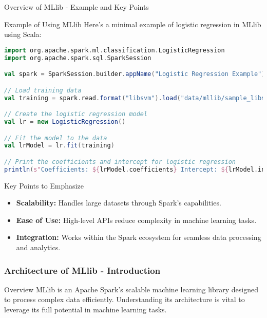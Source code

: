 \documentclass[aspectratio=169]{beamer}
\begin{document}
\begin{frame}[fragile]{Overview of MLlib - Example and Key Points}
    \begin{block}{Example of Using MLlib}
        Here’s a minimal example of logistic regression in MLlib using Scala:
        \begin{lstlisting}[language=Scala]
import org.apache.spark.ml.classification.LogisticRegression
import org.apache.spark.sql.SparkSession

val spark = SparkSession.builder.appName("Logistic Regression Example").getOrCreate()

// Load training data
val training = spark.read.format("libsvm").load("data/mllib/sample_libsvm_data.txt")

// Create the logistic regression model
val lr = new LogisticRegression()

// Fit the model to the data
val lrModel = lr.fit(training)

// Print the coefficients and intercept for logistic regression
println(s"Coefficients: ${lrModel.coefficients} Intercept: ${lrModel.intercept}")
        \end{lstlisting}
    \end{block}

    \begin{block}{Key Points to Emphasize}
        \begin{itemize}
            \item \textbf{Scalability:} Handles large datasets through Spark’s capabilities.
            \item \textbf{Ease of Use:} High-level APIs reduce complexity in machine learning tasks.
            \item \textbf{Integration:} Works within the Spark ecosystem for seamless data processing and analytics.
        \end{itemize}
    \end{block}
\end{frame}

\begin{frame}[fragile]
    \frametitle{Architecture of MLlib - Introduction}
    \begin{block}{Overview}
        MLlib is an Apache Spark's scalable machine learning library designed to process complex data efficiently. Understanding its architecture is vital to leverage its full potential in machine learning tasks.
    \end{block}
\end{frame}
\end{document}
